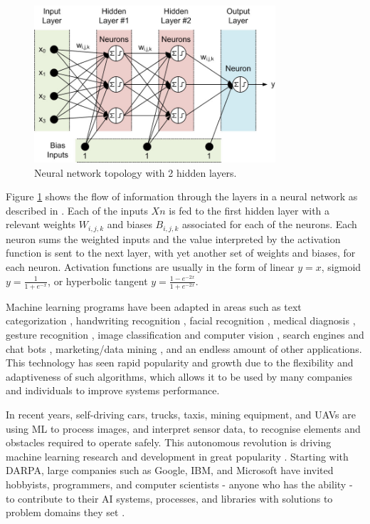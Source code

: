 \documentclass[fleqn,twoside,12pt]{report}
\begin{document}
\begin{figure}[h]
	\centering
	\includegraphics[width=0.8\textwidth]{neural_net.jpeg}
	\caption{Neural network topology with 2 hidden layers.}
	\label{fig:neural_net}
\end{figure}

Figure \ref{fig:neural_net} shows the flow of information through the layers in a neural network as described in \cite{smith}. Each of the inputs $Xn$ is fed to the first hidden layer with a relevant weights $W_{i,j,k}$ and biases $B_{i,j,k}$ associated for each of the neurons. Each neuron sums the weighted inputs and the value interpreted by the activation function is sent to the next layer, with yet another set of weights and biases, for each neuron. Activation functions are usually in the form of linear $y=x$, sigmoid $y=\frac{1}{1+e^{-x}}$, or hyperbolic tangent $y=\frac{1-e^{-2x}}{1+e^{-2x}}$.

Machine learning programs have been adapted in areas such as text categorization \cite{sebastiani}, handwriting recognition \cite{bottou,bahlmann}, facial recognition \cite{bartlett,bartlett2,mohammed}, medical diagnosis \cite{shipp,ye,dreiseitl}, gesture recognition \cite{lustrek,rautaray}, image classification and computer vision \cite{chapelle,ciresan,krizhevsky}, search engines and chat bots \cite{boyan,graepel,jia}, marketing/data mining \cite{cui,bose}, and an endless amount of other applications. This technology has seen rapid popularity and growth due to the flexibility and adaptiveness of such algorithms, which allows it to be used by many companies and individuals to improve systems performance. 

In recent years, self-driving cars, trucks, taxis, mining equipment, and UAVs are using ML to process images, and interpret sensor data, to recognise elements and obstacles required to operate safely. This autonomous revolution is driving machine learning research and development in great popularity \cite{lecun}. Starting with DARPA, large companies such as Google, IBM, and Microsoft have invited hobbyists, programmers, and computer scientists - anyone who has the ability - to contribute to their AI systems, processes, and libraries with solutions to problem domains they set \cite{tensorflow,cortana,udacity,xprize}.
\end{document}
